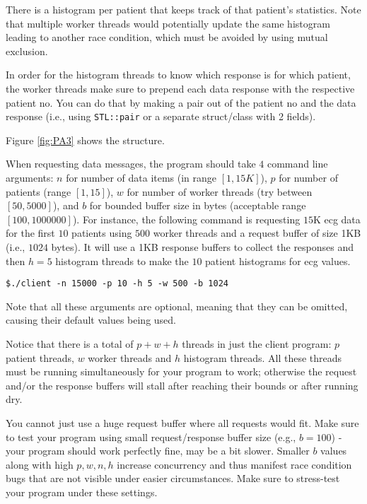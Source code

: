\documentclass[12pt]{article}
\begin{document}
There is a histogram per patient that keeps track of that patient's statistics. Note that multiple worker threads would potentially update the same histogram leading to another race condition, which must be avoided by using mutual exclusion.

In order for the histogram threads to know which response is for which patient, the worker threads make sure to prepend each data response with the respective patient no. You can do that by making a pair out of the patient no and the data response (i.e., using \texttt{STL::pair} or a separate struct/class with 2 fields). 


 Figure \ref{fig:PA3} shows the structure.

When requesting data messages, the program should take $4$ command line arguments: $n$ for number of data items (in range $[1,15K]$), $p$ for number of patients (range $[1,15]$), $w$ for number of worker threads (try between $[50, 5000]$), and $b$ for bounded buffer size in bytes (acceptable range $[100, 1000000]$). For instance, the following command is requesting $15$K ecg data for the first $10$ patients using $500$ worker threads and a request buffer of size 1KB (i.e., $1024$ bytes). It will use a 1KB response buffers to collect the responses and then $h=5$ histogram threads to make the $10$ patient histograms for ecg values.

\begin{lstlisting}[style=bash]
	$./client -n 15000 -p 10 -h 5 -w 500 -b 1024
\end{lstlisting}

Note that all these arguments are optional, meaning that they can be omitted, causing their default values being used.

Notice that there is a total of $p+w+h$ threads in just the client program: $p$ patient threads, $w$ worker threads and $h$ histogram threads. All these threads must be running simultaneously for your program to work; otherwise the request and/or the response buffers will stall after reaching their bounds or after running dry. 

You cannot just use a huge request buffer where all requests would fit. Make sure to test your program using small request/response buffer size (e.g., $b=100$) - your program should work perfectly fine, may be a bit slower. Smaller $b$ values along with high $p, w, n, h$ increase concurrency and thus manifest race condition bugs that are not visible under easier circumstances. Make sure to stress-test your program under these settings.
\end{document}
